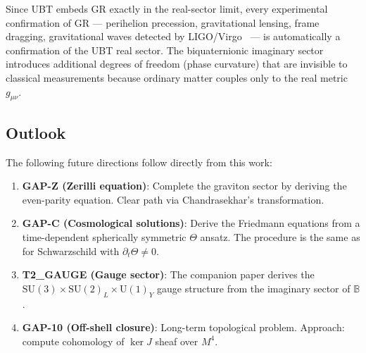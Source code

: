 \documentclass[12pt,a4paper]{article}
\theoremstyle{definition}
\theoremstyle{remark}
\newcommand{\B}{\mathbb{B}}
\newcommand{\gmn}{g_{\mu\nu}}
\begin{document}
Since UBT embeds GR exactly in the real-sector limit, every experimental
confirmation of GR --- perihelion precession, gravitational lensing, frame
dragging, gravitational waves detected by LIGO/Virgo~\cite{Abbott2016} ---
is automatically a confirmation of the UBT real sector.  The biquaternionic
imaginary sector introduces additional degrees of freedom (phase curvature) that
are invisible to classical measurements because ordinary matter couples only to
the real metric $\gmn$.

\subsection{Outlook}
\label{sec:outlook}

The following future directions follow directly from this work:

\begin{enumerate}
  \item \textbf{GAP-Z (Zerilli equation)}: Complete the graviton sector by
    deriving the even-parity equation.  Clear path via Chandrasekhar's
    transformation.

  \item \textbf{GAP-C (Cosmological solutions)}: Derive the Friedmann equations
    from a time-dependent spherically symmetric $\Theta$ ansatz.  The procedure
    is the same as for Schwarzschild with $\partial_t\Theta \neq 0$.

  \item \textbf{T2\_GAUGE (Gauge sector)}: The companion paper derives the
    $\mathrm{SU}(3)\times\mathrm{SU}(2)_L\times\mathrm{U}(1)_Y$ gauge structure
    from the imaginary sector of $\B$.

  \item \textbf{GAP-10 (Off-shell closure)}: Long-term topological problem.
    Approach: compute cohomology of $\ker J$ sheaf over $M^4$.
\end{enumerate}

\end{document}
